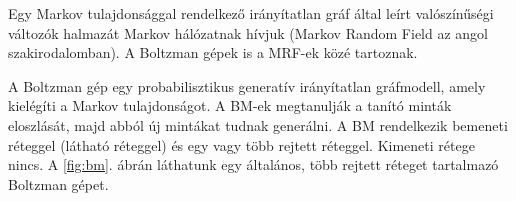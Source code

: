 



Egy Markov tulajdonsággal rendelkező irányítatlan gráf által leírt valószínűségi változók halmazát Markov hálózatnak hívjuk (Markov Random Field az angol szakirodalomban). A Boltzman gépek is a MRF-ek közé tartoznak.

A Boltzman gép egy probabilisztikus generatív irányítatlan gráfmodell, amely kielégíti a Markov tulajdonságot. A BM-ek megtanulják a tanító minták eloszlását, majd abból új mintákat tudnak generálni. A BM rendelkezik bemeneti réteggel (látható réteggel) és egy vagy több rejtett réteggel. Kimeneti rétege nincs. A \ref{fig:bm}. ábrán láthatunk egy általános, több rejtett réteget tartalmazó Boltzman gépet.



